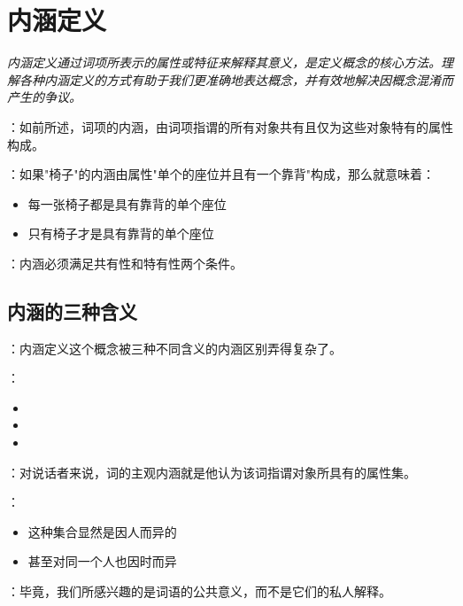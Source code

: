 \section{内涵定义}

\begin{logicbox}[title=引言]
\textit{内涵定义通过词项所表示的属性或特征来解释其意义，是定义概念的核心方法。理解各种内涵定义的方式有助于我们更准确地表达概念，并有效地解决因概念混淆而产生的争议。}
\end{logicbox}

\begin{theorembox}[title=内涵的基本概念回顾]
：如前所述，词项的内涵，由词项指谓的所有对象共有且仅为这些对象特有的属性构成。

：如果"椅子"的内涵由属性"单个的座位并且有一个靠背"构成，那么就意味着：
\begin{itemize}
  \item 每一张椅子都是具有靠背的单个座位
  \item 只有椅子才是具有靠背的单个座位
\end{itemize}

：内涵必须满足共有性和特有性两个条件。
\end{theorembox}

\subsection{内涵的三种含义}

\begin{theorembox}[title=内涵概念的复杂性]
：内涵定义这个概念被三种不同含义的内涵区别弄得复杂了。

：
\begin{itemize}
  \item {}
  \item {}
  \item {}
\end{itemize}
\end{theorembox}

\begin{theorembox}[title=主观内涵]
：对说话者来说，词的主观内涵就是他认为该词指谓对象所具有的属性集。

：
\begin{itemize}
  \item 这种集合显然是因人而异的
  \item 甚至对同一个人也因时而异
\end{itemize}

：毕竟，我们所感兴趣的是词语的公共意义，而不是它们的私人解释。
\end{theorembox}

